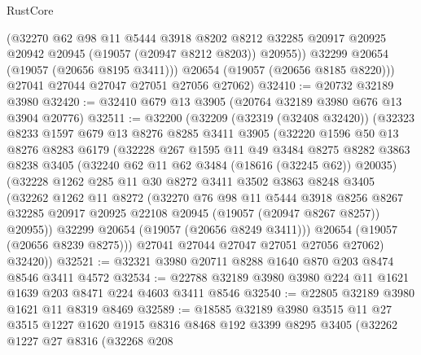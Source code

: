 \begin{lexlean}{RustCore}
\begin{coremodule}
            (@32270
              @62
              @98
              @11
              @5444
              @3918
              @8202
              @8212
              @32285
              @20917
              @20925
              @20942
              @20945
              (@19057 (@20947 @8212 @8203))
              @20955))
          @32299
          @20654
          (@19057 (@20656 @8195 @3411)))
        @20654
        (@19057 (@20656 @8185 @8220)))
      @27041
      @27044
      @27047
      @27051
      @27056
      @27062)
@32410 := @20732 @32189 @3980
@32420 := @32410 @679 @13 @3905 (@20764 @32189 @3980 @676 @13 @3904 @20776)
@32511 := @32200
    (@32209
      (@32319 (@32408 @32420))
      (@32323
        @8233
        @1597
        @679
        @13
        @8276
        @8285
        @3411
        @3905
        (@32220
          @1596
          @50
          @13
          @8276
          @8283
          @6179
          (@32228
            @267
            @1595
            @11
            @49
            @3484
            @8275
            @8282
            @3863
            @8238
            @3405
            (@32240 @62 @11 @62 @3484 (@18616 (@32245 @62)) @20035)
            (@32228
              @1262
              @285
              @11
              @30
              @8272
              @3411
              @3502
              @3863
              @8248
              @3405
              (@32262
                @1262
                @11
                @8272
                (@32270
                  @76
                  @98
                  @11
                  @5444
                  @3918
                  @8256
                  @8267
                  @32285
                  @20917
                  @20925
                  @22108
                  @20945
                  (@19057 (@20947 @8267 @8257))
                  @20955))
              @32299
              @20654
              (@19057 (@20656 @8249 @3411)))
            @20654
            (@19057 (@20656 @8239 @8275)))
          @27041
          @27044
          @27047
          @27051
          @27056
          @27062)
        @32420))
@32521 := @32321 @3980 @20711 @8288 @1640 @870 @203 @8474 @8546 @3411 @4572
@32534 := @22788 @32189 @3980 @3980 @224 @11 @1621 @1639 @203 @8471 @224 @4603 @3411 @8546
@32540 := @22805 @32189 @3980 @1621 @11 @8319 @8469
@32589 := @18585
    @32189
    @3980
    @3515
    @11
    @27
    @3515
    @1227
    @1620
    @1915
    @8316
    @8468
    @192
    @3399
    @8295
    @3405
    (@32262
      @1227
      @27
      @8316
      (@32268
        @208

\end{coremodule}
\end{lexlean}
